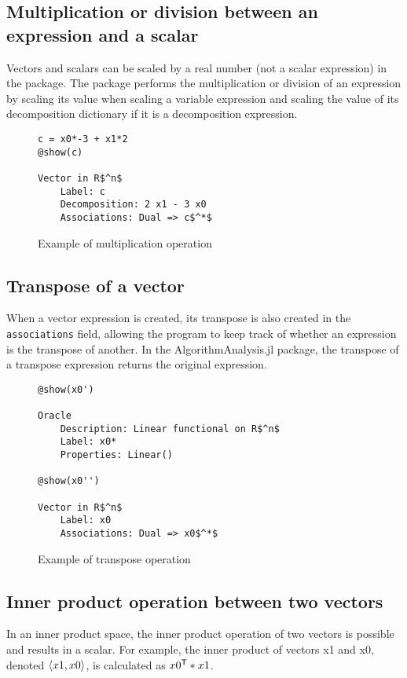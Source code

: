 \subsection*{Multiplication or division between an expression and a scalar} 
Vectors and scalars can be scaled by a real number (not a scalar expression) in the package. The package performs the multiplication or division of an expression by scaling its value when scaling a variable expression and scaling the value of its decomposition dictionary if it is a decomposition expression.

\begin{figure}[!h]
	\begin{lstlisting}[mathescape]
c = x0*-3 + x1*2
@show(c)

Vector in R$^n$
	Label: c
	Decomposition: 2 x1 - 3 x0
	Associations: Dual => c$^*$

	\end{lstlisting}
	\caption{Example of multiplication operation}
	\label{ex_scalar}
\end{figure}

\subsection*{Transpose of a vector}
When a vector expression is created, its transpose is also created in the \texttt{associations} field, allowing the program to keep track of whether an expression is the transpose of another. In the AlgorithmAnalysis.jl package, the transpose of a transpose expression returns the original expression.

\begin{figure}[!h]
	\begin{lstlisting}[mathescape]
@show(x0')

Oracle
	Description: Linear functional on R$^n$
	Label: x0*
	Properties: Linear()

@show(x0'')

Vector in R$^n$
	Label: x0
	Associations: Dual => x0$^*$
	\end{lstlisting}
	\caption{Example of transpose operation}
	\label{ex_transpose}
\end{figure}

\subsection*{Inner product operation between two vectors}
In an inner product space, the inner product operation of two vectors is possible and results in a scalar. For example, the inner product of vectors x1 and x0, denoted $\langle x1, x0 \rangle$, is calculated as $x0^{\mathsf{T}} * x1$.

